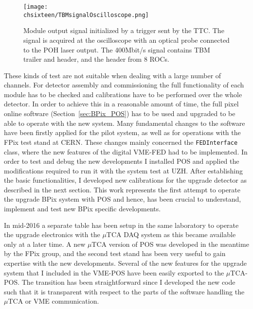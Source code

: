 \begin{figure}[!htb]
 \begin{center}
  \texttt{[image: \\chsixteen/TBMsignalOscilloscope.png]}
 \end{center}
 \caption{Module output signal initialized by a trigger sent by the TTC. The signal is acquired at the oscilloscope with an optical probe connected to the POH laser output. The 400\unit{Mbit/s} signal contains TBM trailer and header, and the header from 8 ROCs.}
 \label{fig:TestTBM}
\end{figure} 

These kinds of test are not suitable when dealing with a large number of channels. For detector assembly and commissioning the full functionality of each module has to be checked and calibrations have to be performed over the whole detector. In order to achieve this in a reasonable amount of time, the full pixel online software (Section~\ref{sec:BPix_POS}) has to be used and upgraded to be able to operate with the new system.
Many fundamental changes to the software have been firstly applied for the pilot system, as well as for operations with the FPix test stand at CERN.
These changes mainly concerned the \texttt{FEDInterface} class, where the new features of the digital VME-FED had to be implemented.
In order to test and debug the new developments I installed POS and applied the modifications required to run it with the system test at UZH.
After establishing the basic functionalities, I developed new calibrations for the upgrade detector as described in the next section.
This work represents the first attempt to operate the upgrade BPix system with POS and hence, has been crucial to understand, implement and test new BPix specific developments.

In mid-2016 a separate table has been setup in the same laboratory to operate the upgrade electronics with the $\mu$TCA DAQ system as this became available only at a later time.
A new $\mu$TCA version of POS was developed in the meantime by the FPix group, and the second test stand has been very useful to gain expertise with the new developments.
Several of the new features for the upgrade system that I included in the VME-POS have been easily exported to the $\mu$TCA-POS.
The transition has been straightforward since I developed the new code such that it is transparent with respect to the parts of the software handling the $\mu$TCA or VME communication.

